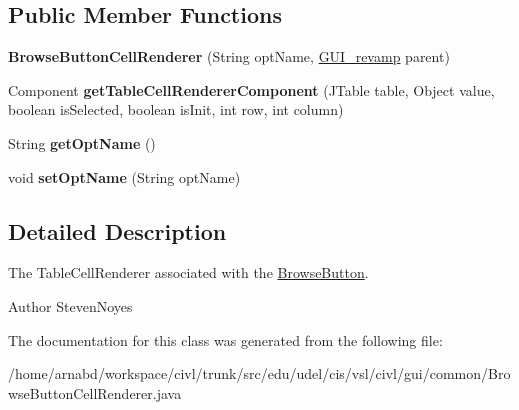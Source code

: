 \subsection*{Public Member Functions}
\begin{DoxyCompactItemize}
\item 
\hypertarget{classedu_1_1udel_1_1cis_1_1vsl_1_1civl_1_1gui_1_1common_1_1BrowseButtonCellRenderer_a384b89dc3b61737ca4cd50bcd318dc4a}{}{\bfseries Browse\+Button\+Cell\+Renderer} (String opt\+Name, \hyperlink{classedu_1_1udel_1_1cis_1_1vsl_1_1civl_1_1gui_1_1common_1_1GUI__revamp}{G\+U\+I\+\_\+revamp} parent)\label{classedu_1_1udel_1_1cis_1_1vsl_1_1civl_1_1gui_1_1common_1_1BrowseButtonCellRenderer_a384b89dc3b61737ca4cd50bcd318dc4a}

\item 
\hypertarget{classedu_1_1udel_1_1cis_1_1vsl_1_1civl_1_1gui_1_1common_1_1BrowseButtonCellRenderer_a87c2c9e6c64ca3d8a7cad9b8f913a6f5}{}Component {\bfseries get\+Table\+Cell\+Renderer\+Component} (J\+Table table, Object value, boolean is\+Selected, boolean is\+Init, int row, int column)\label{classedu_1_1udel_1_1cis_1_1vsl_1_1civl_1_1gui_1_1common_1_1BrowseButtonCellRenderer_a87c2c9e6c64ca3d8a7cad9b8f913a6f5}

\item 
\hypertarget{classedu_1_1udel_1_1cis_1_1vsl_1_1civl_1_1gui_1_1common_1_1BrowseButtonCellRenderer_ac08d33ea9fa4f3dd71163edb04f61083}{}String {\bfseries get\+Opt\+Name} ()\label{classedu_1_1udel_1_1cis_1_1vsl_1_1civl_1_1gui_1_1common_1_1BrowseButtonCellRenderer_ac08d33ea9fa4f3dd71163edb04f61083}

\item 
\hypertarget{classedu_1_1udel_1_1cis_1_1vsl_1_1civl_1_1gui_1_1common_1_1BrowseButtonCellRenderer_a48fc8094a181b0d7a9c073ff1e07fde9}{}void {\bfseries set\+Opt\+Name} (String opt\+Name)\label{classedu_1_1udel_1_1cis_1_1vsl_1_1civl_1_1gui_1_1common_1_1BrowseButtonCellRenderer_a48fc8094a181b0d7a9c073ff1e07fde9}

\end{DoxyCompactItemize}


\subsection{Detailed Description}
The Table\+Cell\+Renderer associated with the \hyperlink{classedu_1_1udel_1_1cis_1_1vsl_1_1civl_1_1gui_1_1common_1_1BrowseButton}{Browse\+Button}. 

\begin{DoxyAuthor}{Author}
Steven\+Noyes 
\end{DoxyAuthor}


The documentation for this class was generated from the following file\+:\begin{DoxyCompactItemize}
\item 
/home/arnabd/workspace/civl/trunk/src/edu/udel/cis/vsl/civl/gui/common/Browse\+Button\+Cell\+Renderer.\+java\end{DoxyCompactItemize}
